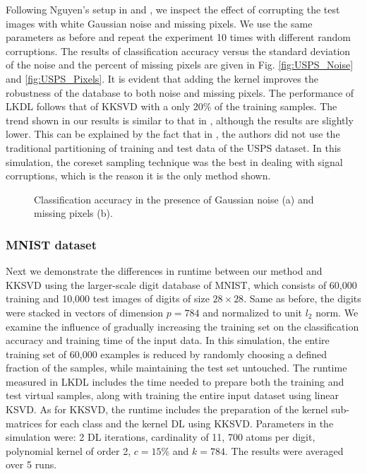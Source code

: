 \documentclass[journal]{IEEEtran}
\begin{document}
Following Nguyen's setup in \cite{KDL} and \cite{KDL2}, we inspect the effect of corrupting the test images with white Gaussian noise and missing pixels. We use the same parameters as before and repeat the experiment 10 times with different random corruptions. The results of classification accuracy versus the standard deviation of the noise and the percent of missing pixels are given in Fig. \ref{fig:USPS_Noise} and \ref{fig:USPS_Pixels}. It is evident that adding the kernel improves the robustness of the database to both noise and missing pixels. The performance of LKDL follows that of KKSVD with a only 20\% of the training samples. The trend shown in our results is similar to that in \cite{KDL2}, although the results are slightly lower. This can be explained by the fact that in \cite{KDL2}, the authors did not use the traditional partitioning of training and test data of the USPS dataset. %
In this simulation, the coreset sampling technique was the best in dealing with signal corruptions, which is the reason it is the only method shown.

\begin{figure*}[!t]
\centering
{}
\hfil
{}
\caption{Classification accuracy in the presence of Gaussian noise (a) and missing pixels (b).}
\label{fig:GRAPH_2}
\end{figure*}

\subsubsection{MNIST dataset} \label{SS:MNIST Results}

Next we demonstrate the differences in runtime between our method and KKSVD using the larger-scale digit database of MNIST, which consists of 60,000 training and 10,000 test images of digits of size $28 \times 28$. Same as before, the digits were stacked in vectors of dimension $p=784$ and normalized to unit $l_2$ norm. We examine the influence of gradually increasing the training set on the classification accuracy and training time of the input data. In this simulation, the entire training set of 60,000 examples is reduced by randomly choosing a defined fraction of the samples, while maintaining the test set untouched. The runtime measured in LKDL includes the time needed to prepare both the training and test virtual samples, along with training the entire input dataset using linear KSVD. As for KKSVD, the runtime includes the preparation of the kernel sub-matrices for each class and the kernel DL using KKSVD. Parameters in the simulation were: 2 DL iterations, cardinality of 11, 700 atoms per digit, polynomial kernel of order 2, $c=15$\% and $k=784$. The results were averaged over 5 runs.
\end{document}
